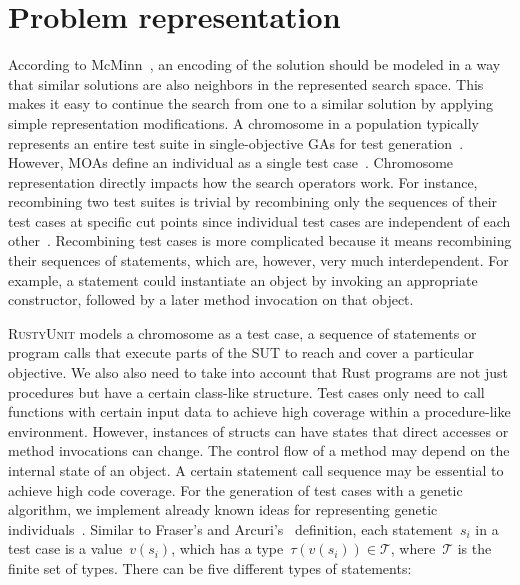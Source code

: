 \documentclass[paper=a4,%
  twoside,%
  BCOR4mm,%
  abstract=true,%
  toc=bibliography,%
  chapterprefix=true,%
  toc=bibliographynumbered,%
  open=right,%
  english,%
  pagesize=pdftex]{scrreprt}
\newcommand{\tech}{\textsc{RustyUnit}\xspace}
\newcommand{\sut}{\ac{SUT}\xspace}
\begin{document}
\section{Problem representation}
\label{sec:problem-representation}
According to McMinn~\cite{McMinn_2004}, an encoding of the solution should be modeled in a way that similar solutions are also neighbors in the represented search space. This makes it easy to continue the search from one to a similar solution by applying simple representation modifications. A chromosome in a population typically represents an entire test suite in single-objective \acp{GA} for test generation~\cite{Fraser_2011a, Campos2017}. However, \acp{MOA} define an individual as a single test case~\cite{Panichella2018}. Chromosome representation directly impacts how the search operators work. For instance, recombining two test suites is trivial by recombining only the sequences of their test cases at specific cut points since individual test cases are independent of each other~\cite{Fraser_2013}. Recombining test cases is more complicated because it means recombining their sequences of statements, which are, however, very much interdependent. For example, a statement could instantiate an object by invoking an appropriate constructor, followed by a later method invocation on that object. 

\tech models a chromosome as a test case, a sequence of statements or program calls that execute parts of the \sut to reach and cover a particular objective. We also also need to take into account that Rust programs are not just procedures but have a certain class-like structure. Test cases only need to call functions with certain input data to achieve high coverage within a procedure-like environment. However, instances of structs can have states that direct accesses or method invocations can change. The control flow of a method may depend on the internal state of an object. A certain statement call sequence may be essential to achieve high code coverage. For the generation of test cases with a genetic algorithm, we implement already known ideas for representing genetic individuals~\cite{Fraser2012,Tonella2004,Arcuri2008}. Similar to Fraser's and Arcuri's~\cite{Fraser_2011a} definition, each statement~$s_i$ in a test case is a value~$v(s_i)$, which has a type~$\tau(v(s_i)) \in \mathcal{T}$, where~$\mathcal{T}$ is the finite set of types. There can be five different types of statements:
\end{document}
